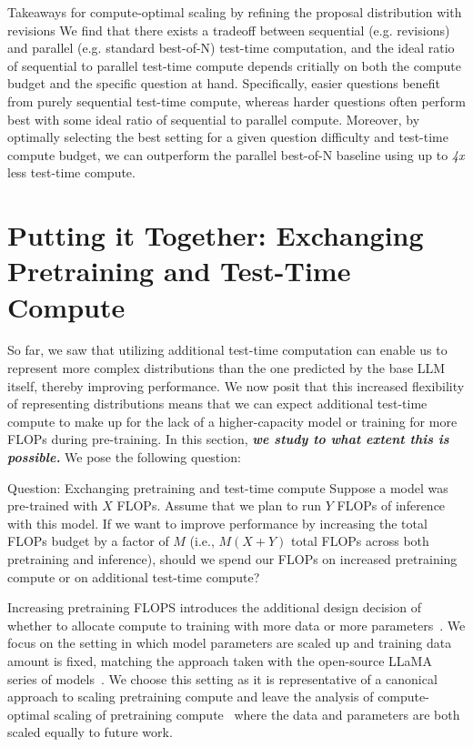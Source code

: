\documentclass[11pt, letterpaper, logo]{googledeepmind}
\begin{document}
\begin{AIbox}{Takeaways for compute-optimal scaling by refining the proposal distribution with revisions}
We find that there exists a tradeoff between sequential (e.g. revisions) and parallel (e.g. standard best-of-N) test-time computation, and the ideal ratio of sequential to parallel test-time compute depends critially on both the compute budget and the specific question at hand. Specifically, easier questions benefit from purely sequential test-time compute, whereas harder questions often perform best with some ideal ratio of sequential to parallel compute. Moreover, by optimally selecting the best setting for a given question difficulty and test-time compute budget, we can outperform the parallel best-of-N baseline using up to \emph{4x} less test-time compute.
\end{AIbox}

\vspace{-0.25cm}
\section{Putting it Together: Exchanging Pretraining and Test-Time Compute}
\label{sec:exchanging}
\vspace{-0.2cm}
So far, we saw that utilizing additional test-time computation can enable us to represent more complex distributions than the one predicted by the base LLM itself, thereby improving performance. We now posit that this increased flexibility of representing distributions means that we can expect additional test-time compute to make up for the lack of a higher-capacity model or training for more FLOPs during pre-training. In this section, \emph{\textbf{we study to what extent this is possible.}} We pose the following question:

\begin{AIbox}{Question: Exchanging pretraining and test-time compute}
    Suppose a model was pre-trained with $X$ FLOPs. Assume that we plan to run $Y$ FLOPs of inference with this model. If we want to improve performance by increasing the total FLOPs budget by a factor of $M$ (i.e., $M(X+Y)$ total FLOPs across both pretraining and inference), should we spend our FLOPs on increased pretraining compute or on additional test-time compute?
\end{AIbox}
Increasing pretraining FLOPS introduces the additional design decision of whether to allocate compute to training with more data or more parameters~\citep{hoffmann2022training}. We focus on the setting in which model parameters are scaled up and training data amount is fixed, matching the approach taken with the open-source LLaMA series of models~\citep{touvron2023llama2openfoundation}. We choose this setting as it is representative of a canonical approach to scaling pretraining compute and leave the analysis of compute-optimal scaling of pretraining compute~\citep{sardana2023chinchillaoptimal} where the data and parameters are both scaled equally to future work.
\end{document}
